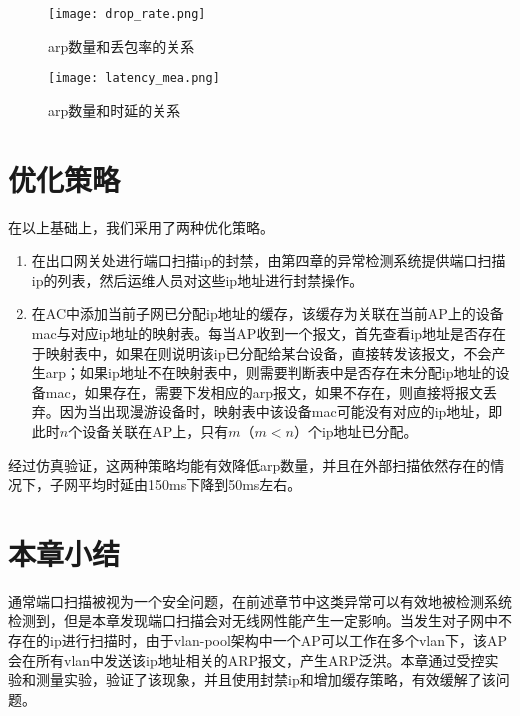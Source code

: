\begin{figure}
  \centering
  \texttt{[image: drop\_rate.png]}
  \caption{arp数量和丢包率的关系}
  \label{fig:丢包}
\end{figure}

\begin{figure}
  \centering
  \texttt{[image: latency\_mea.png]}
  \caption{arp数量和时延的关系}
  \label{fig:时延}
\end{figure}
\section{优化策略}
在以上基础上，我们采用了两种优化策略。
\begin{enumerate}
  \item 在出口网关处进行端口扫描ip的封禁，由第四章的异常检测系统提供端口扫描ip的列表，然后运维人员对这些ip地址进行封禁操作。
  \item 在AC中添加当前子网已分配ip地址的缓存，该缓存为关联在当前AP上的设备mac与对应ip地址的映射表。每当AP收到一个报文，首先查看ip地址是否存在于映射表中，如果在则说明该ip已分配给某台设备，直接转发该报文，不会产生arp；如果ip地址不在映射表中，则需要判断表中是否存在未分配ip地址的设备mac，如果存在，需要下发相应的arp报文，如果不存在，则直接将报文丢弃。因为当出现漫游设备时，映射表中该设备mac可能没有对应的ip地址，即此时$n$个设备关联在AP上，只有$m$（$m<n$）个ip地址已分配。
\end{enumerate}
经过仿真验证，这两种策略均能有效降低arp数量，并且在外部扫描依然存在的情况下，子网平均时延由150ms下降到50ms左右。


\section{本章小结}
通常端口扫描被视为一个安全问题，在前述章节中这类异常可以有效地被检测系统检测到，但是本章发现端口扫描会对无线网性能产生一定影响。当发生对子网中不存在的ip进行扫描时，由于vlan-pool架构中一个AP可以工作在多个vlan下，该AP会在所有vlan中发送该ip地址相关的ARP报文，产生ARP泛洪。本章通过受控实验和测量实验，验证了该现象，并且使用封禁ip和增加缓存策略，有效缓解了该问题。